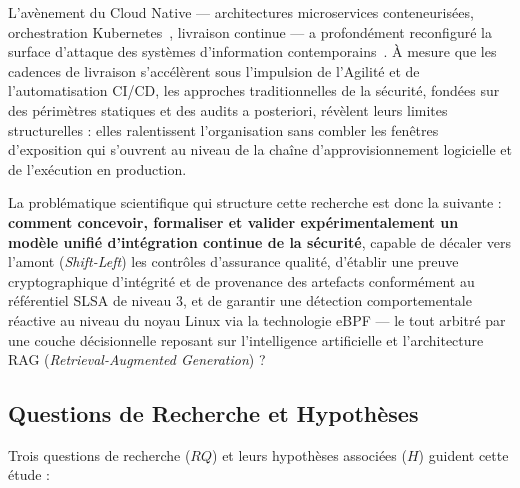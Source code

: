 L'avènement du Cloud Native — architectures microservices conteneurisées, orchestration Kubernetes~\cite{burns_k8s_design_2016}, livraison continue — a profondément reconfiguré la surface d'attaque des systèmes d'information contemporains~\cite{myrbakken_devsecops_2017}. À mesure que les cadences de livraison s'accélèrent sous l'impulsion de l'Agilité et de l'automatisation CI/CD, les approches traditionnelles de la sécurité, fondées sur des périmètres statiques et des audits a posteriori, révèlent leurs limites structurelles : elles ralentissent l'organisation sans combler les fenêtres d'exposition qui s'ouvrent au niveau de la chaîne d'approvisionnement logicielle et de l'exécution en production.

La problématique scientifique qui structure cette recherche est donc la suivante : \textbf{comment concevoir, formaliser et valider expérimentalement un modèle unifié d'intégration continue de la sécurité}, capable de décaler vers l'amont (\textit{Shift-Left}) les contrôles d'assurance qualité, d'établir une preuve cryptographique d'intégrité et de provenance des artefacts conformément au référentiel SLSA de niveau 3, et de garantir une détection comportementale réactive au niveau du noyau Linux via la technologie eBPF — le tout arbitré par une couche décisionnelle reposant sur l'intelligence artificielle et l'architecture RAG (\textit{Retrieval-Augmented Generation}) ?

\subsection{Questions de Recherche et Hypothèses}

Trois questions de recherche ($RQ$) et leurs hypothèses associées ($H$) guident cette étude :

